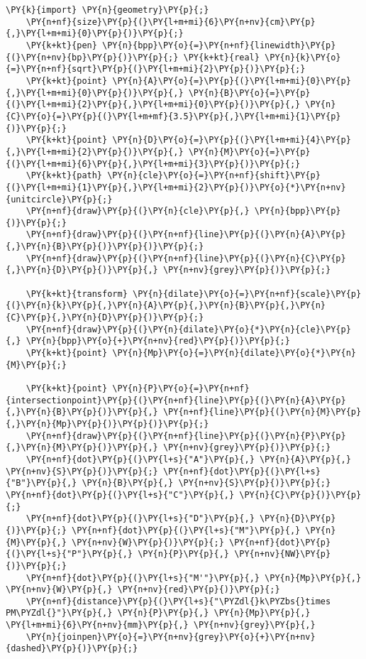 \begin{Verbatim}[commandchars=\\\{\}]
    \PY{k}{import} \PY{n}{geometry}\PY{p}{;}
    \PY{n+nf}{size}\PY{p}{(}\PY{l+m+mi}{6}\PY{n+nv}{cm}\PY{p}{,}\PY{l+m+mi}{0}\PY{p}{)}\PY{p}{;}
    \PY{k+kt}{pen} \PY{n}{bpp}\PY{o}{=}\PY{n+nf}{linewidth}\PY{p}{(}\PY{n+nv}{bp}\PY{p}{)}\PY{p}{;} \PY{k+kt}{real} \PY{n}{k}\PY{o}{=}\PY{n+nf}{sqrt}\PY{p}{(}\PY{l+m+mi}{2}\PY{p}{)}\PY{p}{;}
    \PY{k+kt}{point} \PY{n}{A}\PY{o}{=}\PY{p}{(}\PY{l+m+mi}{0}\PY{p}{,}\PY{l+m+mi}{0}\PY{p}{)}\PY{p}{,} \PY{n}{B}\PY{o}{=}\PY{p}{(}\PY{l+m+mi}{2}\PY{p}{,}\PY{l+m+mi}{0}\PY{p}{)}\PY{p}{,} \PY{n}{C}\PY{o}{=}\PY{p}{(}\PY{l+m+mf}{3.5}\PY{p}{,}\PY{l+m+mi}{1}\PY{p}{)}\PY{p}{;}
    \PY{k+kt}{point} \PY{n}{D}\PY{o}{=}\PY{p}{(}\PY{l+m+mi}{4}\PY{p}{,}\PY{l+m+mi}{2}\PY{p}{)}\PY{p}{,} \PY{n}{M}\PY{o}{=}\PY{p}{(}\PY{l+m+mi}{6}\PY{p}{,}\PY{l+m+mi}{3}\PY{p}{)}\PY{p}{;}
    \PY{k+kt}{path} \PY{n}{cle}\PY{o}{=}\PY{n+nf}{shift}\PY{p}{(}\PY{l+m+mi}{1}\PY{p}{,}\PY{l+m+mi}{2}\PY{p}{)}\PY{o}{*}\PY{n+nv}{unitcircle}\PY{p}{;}
    \PY{n+nf}{draw}\PY{p}{(}\PY{n}{cle}\PY{p}{,} \PY{n}{bpp}\PY{p}{)}\PY{p}{;}
    \PY{n+nf}{draw}\PY{p}{(}\PY{n+nf}{line}\PY{p}{(}\PY{n}{A}\PY{p}{,}\PY{n}{B}\PY{p}{)}\PY{p}{)}\PY{p}{;}
    \PY{n+nf}{draw}\PY{p}{(}\PY{n+nf}{line}\PY{p}{(}\PY{n}{C}\PY{p}{,}\PY{n}{D}\PY{p}{)}\PY{p}{,} \PY{n+nv}{grey}\PY{p}{)}\PY{p}{;}

    \PY{k+kt}{transform} \PY{n}{dilate}\PY{o}{=}\PY{n+nf}{scale}\PY{p}{(}\PY{n}{k}\PY{p}{,}\PY{n}{A}\PY{p}{,}\PY{n}{B}\PY{p}{,}\PY{n}{C}\PY{p}{,}\PY{n}{D}\PY{p}{)}\PY{p}{;}
    \PY{n+nf}{draw}\PY{p}{(}\PY{n}{dilate}\PY{o}{*}\PY{n}{cle}\PY{p}{,} \PY{n}{bpp}\PY{o}{+}\PY{n+nv}{red}\PY{p}{)}\PY{p}{;}
    \PY{k+kt}{point} \PY{n}{Mp}\PY{o}{=}\PY{n}{dilate}\PY{o}{*}\PY{n}{M}\PY{p}{;}

    \PY{k+kt}{point} \PY{n}{P}\PY{o}{=}\PY{n+nf}{intersectionpoint}\PY{p}{(}\PY{n+nf}{line}\PY{p}{(}\PY{n}{A}\PY{p}{,}\PY{n}{B}\PY{p}{)}\PY{p}{,} \PY{n+nf}{line}\PY{p}{(}\PY{n}{M}\PY{p}{,}\PY{n}{Mp}\PY{p}{)}\PY{p}{)}\PY{p}{;}
    \PY{n+nf}{draw}\PY{p}{(}\PY{n+nf}{line}\PY{p}{(}\PY{n}{P}\PY{p}{,}\PY{n}{M}\PY{p}{)}\PY{p}{,} \PY{n+nv}{grey}\PY{p}{)}\PY{p}{;}
    \PY{n+nf}{dot}\PY{p}{(}\PY{l+s}{"A"}\PY{p}{,} \PY{n}{A}\PY{p}{,} \PY{n+nv}{S}\PY{p}{)}\PY{p}{;} \PY{n+nf}{dot}\PY{p}{(}\PY{l+s}{"B"}\PY{p}{,} \PY{n}{B}\PY{p}{,} \PY{n+nv}{S}\PY{p}{)}\PY{p}{;} \PY{n+nf}{dot}\PY{p}{(}\PY{l+s}{"C"}\PY{p}{,} \PY{n}{C}\PY{p}{)}\PY{p}{;}
    \PY{n+nf}{dot}\PY{p}{(}\PY{l+s}{"D"}\PY{p}{,} \PY{n}{D}\PY{p}{)}\PY{p}{;} \PY{n+nf}{dot}\PY{p}{(}\PY{l+s}{"M"}\PY{p}{,} \PY{n}{M}\PY{p}{,} \PY{n+nv}{W}\PY{p}{)}\PY{p}{;} \PY{n+nf}{dot}\PY{p}{(}\PY{l+s}{"P"}\PY{p}{,} \PY{n}{P}\PY{p}{,} \PY{n+nv}{NW}\PY{p}{)}\PY{p}{;}
    \PY{n+nf}{dot}\PY{p}{(}\PY{l+s}{"M'"}\PY{p}{,} \PY{n}{Mp}\PY{p}{,} \PY{n+nv}{W}\PY{p}{,} \PY{n+nv}{red}\PY{p}{)}\PY{p}{;}
    \PY{n+nf}{distance}\PY{p}{(}\PY{l+s}{"\PYZdl{}k\PYZbs{}times PM\PYZdl{}"}\PY{p}{,} \PY{n}{P}\PY{p}{,} \PY{n}{Mp}\PY{p}{,} \PY{l+m+mi}{6}\PY{n+nv}{mm}\PY{p}{,} \PY{n+nv}{grey}\PY{p}{,}
    \PY{n}{joinpen}\PY{o}{=}\PY{n+nv}{grey}\PY{o}{+}\PY{n+nv}{dashed}\PY{p}{)}\PY{p}{;}
\end{Verbatim}
